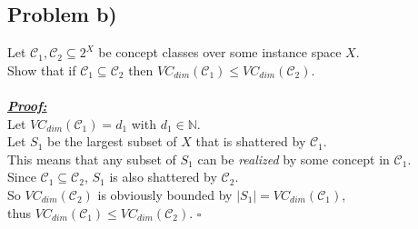 \subsection*{Problem b)}
Let $\mathcal{C}_1, \mathcal{C}_2 \subseteq 2^X$ be concept classes over some instance space $X$.\\
Show that if $\mathcal{C}_1 \subseteq \mathcal{C}_2$ then $VC_{dim}(\mathcal{C}_1) \leq VC_{dim}(\mathcal{C}_2)$.\\
\\
\textbf{\underline{\textit{Proof:}}}\\
Let $VC_{dim}(\mathcal{C}_1) = d_1$ with $d_1\in \mathbb{N}$.\\
Let $S_1$ be the largest subset of $X$ that is shattered by $\mathcal{C}_1$.\\ This means that any subset of  $S_1$ can be \textit{realized} by some concept in $\mathcal{C}_1$.\\ 
Since $\mathcal{C}_1 \subseteq \mathcal{C}_2$, $S_1$ is also shattered by $\mathcal{C}_2$.\\ 
So $VC_{dim}(\mathcal{C}_2)$ is obviously bounded by $|S_1| = VC_{dim}(\mathcal{C}_1)$,\\ 
thus $VC_{dim}(\mathcal{C}_1) \leq VC_{dim}(\mathcal{C}_2)$.
\hfill $\square$
